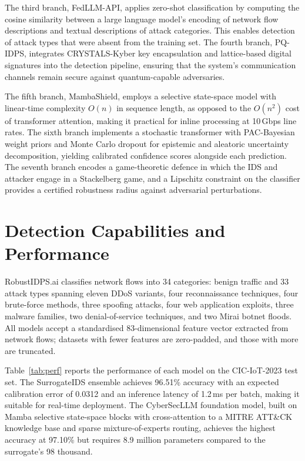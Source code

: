 \documentclass[11pt,a4paper]{article}
\begin{document}
The third branch, FedLLM-API, applies zero-shot classification by
computing the cosine similarity between a large language model's encoding
of network flow descriptions and textual descriptions of attack categories.
This enables detection of attack types that were absent from the training
set. The fourth branch, PQ-IDPS, integrates CRYSTALS-Kyber key
encapsulation and lattice-based digital signatures into the detection
pipeline, ensuring that the system's communication channels remain secure
against quantum-capable adversaries.

The fifth branch, MambaShield, employs a selective state-space model
with linear-time complexity $O(n)$ in sequence length, as opposed to the
$O(n^2)$ cost of transformer attention, making it practical for inline
processing at 10\,Gbps line rates. The sixth branch implements a
stochastic transformer with PAC-Bayesian weight priors and Monte Carlo
dropout for epistemic and aleatoric uncertainty decomposition, yielding
calibrated confidence scores alongside each prediction. The seventh
branch encodes a game-theoretic defence in which the IDS and attacker
engage in a Stackelberg game, and a Lipschitz constraint on the classifier
provides a certified robustness radius against adversarial perturbations.

\section{Detection Capabilities and Performance}

RobustIDPS.ai classifies network flows into 34 categories: benign traffic
and 33 attack types spanning eleven DDoS variants, four reconnaissance
techniques, four brute-force methods, three spoofing attacks, four web
application exploits, three malware families, two denial-of-service
techniques, and two Mirai botnet floods. All models accept a standardised
83-dimensional feature vector extracted from network flows; datasets with
fewer features are zero-padded, and those with more are truncated.

Table~\ref{tab:perf} reports the performance of each model on the
CIC-IoT-2023 test set. The SurrogateIDS ensemble achieves 96.51\%
accuracy with an expected calibration error of 0.0312 and an inference
latency of 1.2\,ms per batch, making it suitable for real-time deployment.
The CyberSecLLM foundation model, built on Mamba selective state-space
blocks with cross-attention to a MITRE ATT\&CK knowledge base and sparse
mixture-of-experts routing, achieves the highest accuracy at 97.10\% but
requires 8.9 million parameters compared to the surrogate's 98 thousand.
\end{document}
